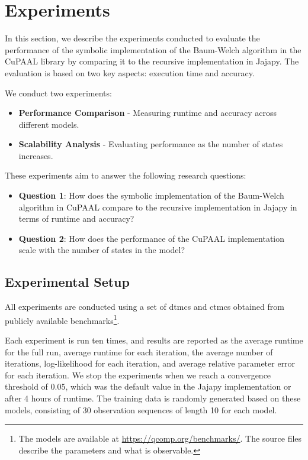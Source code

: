 \section{Experiments}\label{sec:experiments}
In this section, we describe the experiments conducted to evaluate the performance of the symbolic implementation of the Baum-Welch algorithm in the CuPAAL library by comparing it to the recursive implementation in Jajapy. The evaluation is based on two key aspects: execution time and accuracy.

We conduct two experiments:
\begin{itemize}
    \item \textbf{Performance Comparison} - Measuring runtime and accuracy across different models.
    \item \textbf{Scalability Analysis} - Evaluating performance as the number of states increases.
\end{itemize}

These experiments aim to answer the following research questions:
\begin{itemize}
    \item \textbf{Question 1}: How does the symbolic implementation of the Baum-Welch algorithm in CuPAAL compare to the recursive implementation in Jajapy in terms of runtime and accuracy?
    \item \textbf{Question 2}: How does the performance of the CuPAAL implementation scale with the number of states in the model?
\end{itemize}

\subsection{Experimental Setup}
All experiments are conducted using a set of \glspl{dtmc} and \glspl{ctmc} obtained from publicly available benchmarks\footnote{The models are available at \url{https://qcomp.org/benchmarks/}. The source files describe the parameters and what is observable.}.

Each experiment is run ten times, and results are reported as the average runtime for the full run, average runtime for each iteration,
the average number of iterations, log-likelihood for each iteration, and average relative parameter error for each iteration.
We stop the experiments when we reach a convergence threshold of 0.05, which was the default value in the Jajapy implementation or after
4 hours of runtime.
The training data is randomly generated based on these models, consisting of 30 observation sequences of length 10 for each model.

